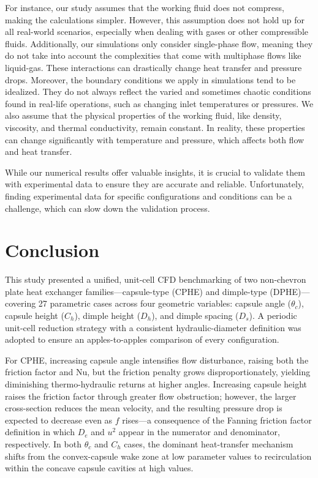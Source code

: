 \documentclass[review,12pt]{elsarticle}
\begin{document}
For instance, our study assumes that the working fluid does not compress, making the calculations simpler. However, this assumption does not hold up for all real-world scenarios, especially when dealing with gases or other compressible fluids. Additionally, our simulations only consider single-phase flow, meaning they do not take into account the complexities that come with multiphase flows like liquid-gas. These interactions can drastically change heat transfer and pressure drops. Moreover, the boundary conditions we apply in simulations tend to be idealized. They do not always reflect the varied and sometimes chaotic conditions found in real-life operations, such as changing inlet temperatures or pressures. We also assume that the physical properties of the working fluid, like density, viscosity, and thermal conductivity, remain constant. In reality, these properties can change significantly with temperature and pressure, which affects both flow and heat transfer.

While our numerical results offer valuable insights, it is crucial to validate them with experimental data to ensure they are accurate and reliable. Unfortunately, finding experimental data for specific configurations and conditions can be a challenge, which can slow down the validation process.


\section{Conclusion}
\label{sec:conclusion}

This study presented a unified, unit-cell CFD benchmarking of two non-chevron plate heat exchanger families---capsule-type (CPHE) and dimple-type (DPHE)---covering 27 parametric cases across four geometric variables: capsule angle ($\theta_c$), capsule height ($C_h$), dimple height ($D_h$), and dimple spacing ($D_s$). A periodic unit-cell reduction strategy with a consistent hydraulic-diameter definition was adopted to ensure an apples-to-apples comparison of every configuration.

For CPHE, increasing capsule angle intensifies flow disturbance, raising both the friction factor and Nu, but the friction penalty grows disproportionately, yielding diminishing thermo-hydraulic returns at higher angles. Increasing capsule height raises the friction factor through greater flow obstruction; however, the larger cross-section reduces the mean velocity, and the resulting pressure drop is expected to decrease even as $f$ rises---a consequence of the Fanning friction factor definition in which $D_e$ and $u^2$ appear in the numerator and denominator, respectively. In both $\theta_c$ and $C_h$ cases, the dominant heat-transfer mechanism shifts from the convex-capsule wake zone at low parameter values to recirculation within the concave capsule cavities at high values.
\end{document}
